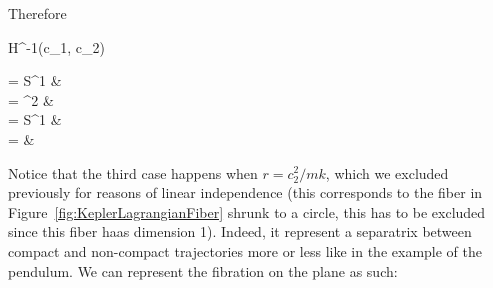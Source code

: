 \documentclass[main.tex]{subfiles}
\begin{document}
\begin{example}
\begin{enumerate}
	\end{enumerate}
	
	Therefore
	\begin{eqalign}
		H^{-1}(c_1, c_2) \begin{dcases}
			 = \R \times S^1 & \\
			= \T^2 & \\
			= S^1 & \\
			= \varnothing & 
		\end{dcases}
	\end{eqalign}
	Notice that the third case happens when $r= c_2^2/mk$, which we excluded previously for reasons of linear independence (this corresponds to the fiber in Figure~\ref{fig:KeplerLagrangianFiber} shrunk to a circle, this has to be excluded since this fiber haas dimension 1). Indeed, it represent a separatrix between compact and non-compact trajectories more or less like in the example of the pendulum. We can represent the fibration on the plane as such:

	\begin{figure}[H]
		\centering
	\end{figure}


\end{example}
\end{document}
